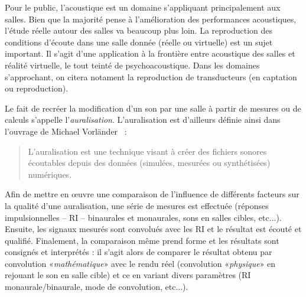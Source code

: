 Pour le public, l'acoustique est un domaine s'appliquant principalement aux salles.
Bien que la majorité pense à l'amélioration des performances acoustiques, l'étude réelle autour des salles va
beaucoup plus loin.
La reproduction des conditions d'écoute dans une salle donnée (réelle ou virtuelle) est un sujet important. Il s'agit d'une
application à la frontière entre acoustique des salles et réalité virtuelle, le tout teinté de psychoacoustique. Dans les
domaines s'approchant, on citera notament la reproduction de transducteurs (en captation ou reproduction).

\medskip

Le fait de recréer la modification d'un son par une salle à partir de mesures ou de calculs s'appelle
l'\emph{auralisation}. L'auralisation est d'ailleurs définie ainsi dans l'ouvrage de Michael
Vorländer~\cite{Vor08} :

\begin{quote}
L'auralisation est une technique visant à créer des fichiers sonores écoutables depuis des données (simulées, mesurées
ou synthétisées) numériques.
\end{quote}

\medskip

Afin de mettre en œuvre une comparaison de l'influence de différents facteurs sur la qualité d'une auralisation, une
série de mesures est effectuée (réponses impulsionnelles -- RI --  binaurales et monaurales, sons en salles cibles,
etc...).  Ensuite, les signaux mesurés sont convolués avec les RI et le résultat est écouté et qualifié. Finalement, la
comparaison même prend forme et les résultats sont consignés et interprétés : il s'agit alors de comparer le résultat
obtenu par convolution «\emph{mathématique}» avec le rendu réel (convolution «\emph{physique}» en rejouant le son en
salle cible) et ce en variant divers paramètres (RI monaurale/binaurale, mode de convolution, etc...).
